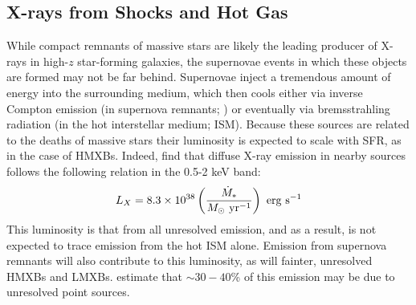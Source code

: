 \subsection{X-rays from Shocks and Hot Gas} \label{sec:ism_bremms}
While compact remnants of massive stars are likely the leading producer of X-rays in high-$z$ star-forming galaxies, the supernovae events in which these objects are formed may not be far behind. Supernovae inject a tremendous amount of energy into the surrounding medium, which then cools either via inverse Compton emission (in supernova remnants; \cite{Oh2001}) or eventually via bremsstrahling radiation (in the hot interstellar medium; ISM). Because these sources are related to the deaths of massive stars their luminosity is expected to scale with SFR, as in the case of HMXBs. Indeed, \cite{Mineo2012b} find that diffuse X-ray emission in nearby sources follows the following relation in the 0.5-2 keV band:
\begin{equation}
	L_X = 8.3 \times 10^{38} \left(\frac{\SFR}{M_{\odot} \ \mathrm{yr}^{-1}} \right) \ \mathrm{erg} \ \mathrm{s}^{-1} \label{eq:LxSFRII_Mineo}
\end{equation}
This luminosity is that from all unresolved emission, and as a result, is not expected to trace emission from the hot ISM alone. Emission from supernova remnants will also contribute to this luminosity, as will fainter, unresolved HMXBs and LMXBs. \cite{Mineo2012b} estimate that $\sim 30-40$\% of this emission may be due to unresolved point sources. 


